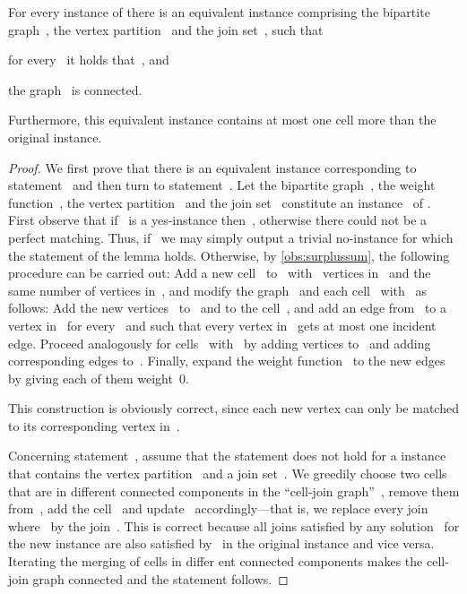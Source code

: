 \begin{lemma}\label{lem:cbmlegalized}
  For every instance of \pCBMs{} there is an equivalent instance comprising the bipartite graph~, the vertex partition~ and the join set~, such that
\begin{lemenum}
\item for every~ it holds that~, and\label{enu:cl11}
\item the graph~ is connected.\label{enu:cl12}
\end{lemenum}
Furthermore, this equivalent instance contains at most one cell more than the original instance.
\end{lemma}
\begin{proof}
  We first prove that there is an equivalent instance corresponding to statement~ and then turn to statement~.
  Let the bipartite graph~, the weight function~, the vertex partition~ and the join set~ constitute an instance~ of \pCBMs{}. First observe that if~ is a yes-instance then~, otherwise there could not be a perfect matching. Thus, if~ we may simply output a trivial no-instance for which the statement of the lemma holds. Otherwise, by \autoref{obs:surplussum}, the following procedure can be carried out: Add a new cell~ to~ with~ vertices in~ and the same number of vertices in~, and modify the graph~ and each cell~ with~ as follows: Add the new vertices~ to~ and to the cell~, and add an edge from~ to a vertex in~ for every~ and such that every vertex in~ gets at most one incident edge. Proceed analogously for cells~ with~ by adding vertices to~ and adding corresponding edges to~. Finally, expand the weight function~ to the new edges by giving each of them weight~0.

This construction is obviously correct, since each new vertex can only be matched to its corresponding vertex in~.

Concerning statement~, assume that the statement does not hold for a instance that contains the vertex partition~ and a join set~. We greedily choose two cells~ that are in different connected components in the ``cell-join graph''~, remove them from~, add the cell~ and update~ accordingly---that is, we replace every join~ where~ by the join~. This is correct because all joins satisfied by any solution~ for the new instance are also satisfied by~ in the original instance and vice versa. Iterating the merging of cells in differ ent connected components makes the cell-join graph connected and the statement follows.
\end{proof}
